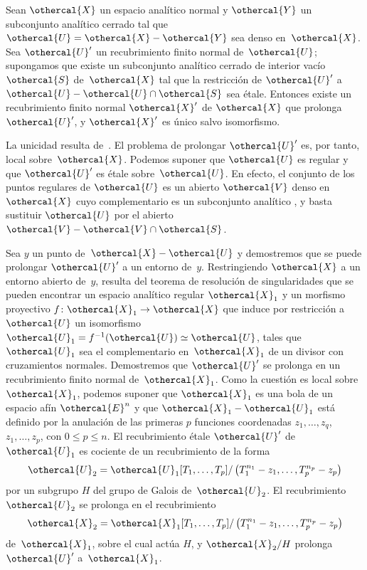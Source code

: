 {}
{\enlargethispage{.5cm}}
\begin{theoreme}
\label{XII.5.4}
Sean
%
%
$\othercal{X}$ un espacio analítico normal y $\othercal{Y}$ un
subconjunto analítico cerrado tal que
$\othercal{U}=\othercal{X}-\othercal{Y}$ sea denso en~$\othercal{X}$.
Sea $\othercal{U}'$ un recubrimiento finito normal de~$\othercal{U}$;
supongamos que existe un subconjunto analítico cerrado de interior vacío
$\othercal{S}$ de~$\othercal{X}$ tal que la restricción de
$\othercal{U}'$ a~$\othercal{U}-\othercal{U}\cap\othercal{S}$ sea étale.
Entonces existe un recubrimiento finito normal $\othercal{X}'$ de
$\othercal{X}$ que prolonga $\othercal{U}'$, y $\othercal{X}'$ es único
salvo isomorfismo.
\end{theoreme}

La unicidad resulta de~. El problema de prolongar
$\othercal{U}'$ es, por tanto, local sobre~$\othercal{X}$. Podemos
suponer que $\othercal{U}$ es regular y que $\othercal{U}'$ es étale
sobre~$\othercal{U}$. En efecto, el conjunto de los puntos regulares de
$\othercal{U}$ es un abierto $\othercal{V}$ denso en~$\othercal{X}$ cuyo
complementario es un subconjunto analítico
\hbox{\cite[~D th]{XII.4}}, y basta sustituir
$\othercal{U}$ por el abierto
$\othercal{V}-\othercal{V}\cap\othercal{S}$.

Sea $y$ un punto de~$\othercal{X}-\othercal{U}$ y demostremos que se
puede prolongar $\othercal{U}'$ a un entorno de~$y$. Restringiendo
$\othercal{X}$ a un entorno abierto de~$y$, resulta del teorema de
resolución de singularidades \cite{XII.8} que se pueden encontrar un
espacio analítico regular $\othercal{X}_1$ y un morfismo proyectivo
$f\colon\othercal{X}_1\to\othercal{X}$ que induce por restricción a
$\othercal{U}$ un isomorfismo
$\othercal{U}_1=f^{-1}(\othercal{U})\simeq\othercal{U}$, tales que
$\othercal{U}_1$ sea el complementario en~$\othercal{X}_1$ de un divisor
con cruzamientos normales. Demostremos que $\othercal{U}'$ se prolonga
en un recubrimiento finito normal de~$\othercal{X}_1$. Como la cuestión
es local sobre~$\othercal{X}_1$, podemos suponer que $\othercal{X}_1$ es
una bola de un espacio afín $\othercal{E}^n$ y que
$\othercal{X}_1-\othercal{U}_1$ está definido por la anulación de las
primeras $p$ funciones coordenadas
{$z_1,\dots,z_q$,}
{$z_1,\dots,z_p$,}
con $0\leq p\leq n$. El recubrimiento étale $\othercal{U}'$ de
$\othercal{U}_1$ es cociente de un recubrimiento de la forma
$$
\othercal{U}_2=\othercal{U}_1[T_1,\dots,T_p]/\left(T_1^{n_1}-z_1,\dots,
T_p^{n_p}-z_p\right)
$$
por un subgrupo $H$ del grupo de Galois de~$\othercal{U}_2$. El
recubrimiento $\othercal{U}_2$ se prolonga
en el recubrimiento
$$
\othercal{X}_2=\othercal{X}_1[T_1,\dots,T_p]/\left(T_1^{n_1}-z_1,\dots,
T_p^{n_p}-z_p\right)
$$
de~$\othercal{X}_1$, sobre el cual actúa $H$, y
$\othercal{X}_2/H$ prolonga $\othercal{U}'$ a~$\othercal{X}_1$.

